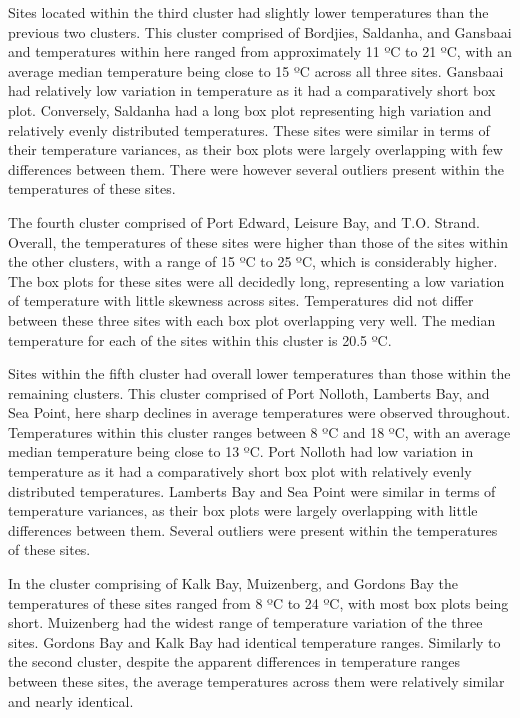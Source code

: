 \documentclass[12pt,]{article}
\begin{document}
Sites located within the third cluster had slightly lower temperatures
than the previous two clusters. This cluster comprised of Bordjies,
Saldanha, and Gansbaai and temperatures within here ranged from
approximately 11 ºC to 21 ºC, with an average median temperature being
close to 15 ºC across all three sites. Gansbaai had relatively low
variation in temperature as it had a comparatively short box plot.
Conversely, Saldanha had a long box plot representing high variation and
relatively evenly distributed temperatures. These sites were similar in
terms of their temperature variances, as their box plots were largely
overlapping with few differences between them. There were however
several outliers present within the temperatures of these sites.

The fourth cluster comprised of Port Edward, Leisure Bay, and T.O.
Strand. Overall, the temperatures of these sites were higher than those
of the sites within the other clusters, with a range of 15 ºC to 25 ºC,
which is considerably higher. The box plots for these sites were all
decidedly long, representing a low variation of temperature with little
skewness across sites. Temperatures did not differ between these three
sites with each box plot overlapping very well. The median temperature
for each of the sites within this cluster is 20.5 ºC.

Sites within the fifth cluster had overall lower temperatures than those
within the remaining clusters. This cluster comprised of Port Nolloth,
Lamberts Bay, and Sea Point, here sharp declines in average temperatures
were observed throughout. Temperatures within this cluster ranges
between 8 ºC and 18 ºC, with an average median temperature being close
to 13 ºC. Port Nolloth had low variation in temperature as it had a
comparatively short box plot with relatively evenly distributed
temperatures. Lamberts Bay and Sea Point were similar in terms of
temperature variances, as their box plots were largely overlapping with
little differences between them. Several outliers were present within
the temperatures of these sites.

In the cluster comprising of Kalk Bay, Muizenberg, and Gordons Bay the
temperatures of these sites ranged from 8 ºC to 24 ºC, with most box
plots being short. Muizenberg had the widest range of temperature
variation of the three sites. Gordons Bay and Kalk Bay had identical
temperature ranges. Similarly to the second cluster, despite the
apparent differences in temperature ranges between these sites, the
average temperatures across them were relatively similar and nearly
identical.
\end{document}
